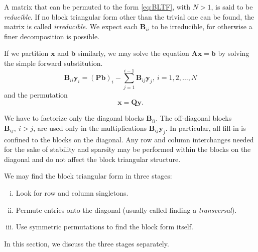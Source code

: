 \begin{defn}
  A matrix that can be permuted to the form \eqref{eq:BLTF}, with
  $N>1$, is said to be \emph{reducible}. If no block triangular form
  other than the trivial one can be found, the matrix is called
  \emph{irreducible}. We expect each $\mathbf{B}_{ii}$ to be irreducible, for
  otherwise a finer decomposition is possible.
\end{defn}

\begin{alg}
  If we partition $\mathbf{x}$ and $\mathbf{b}$ similarly, we may solve the equation
  $\mathbf{Ax=b}$ by solving the simple forward substitution.
  \begin{equation}
    \label{eq:BLTFSolving}
    \mathbf{B}_{ii}\mathbf{y}_i=(\mathbf{Pb})_i-\sum\limits_{j=1}^{i-1}\mathbf{B}_{ij}\mathbf{y}_j,\
    i=1,2,\ldots,N 
  \end{equation}
  and the permutation
  \begin{equation}
    \label{eq:PermutationYtoX}
    \mathbf{x=Qy}.
  \end{equation}
\end{alg}

\begin{rmk}
  We have to factorize only the
  diagonal blocks $\mathbf{B}_{ii}$. The off-diagonal blocks $\mathbf{B}_{ij},\ i>j$,
  are used only in the multiplications $\mathbf{B}_{ij}\mathbf{y}_j$. In particular, all
  fill-in is confined to the blocks on the diagonal. Any row and
  column interchanges needed for the sake of stability and sparsity
  may be performed within the blocks on the diagonal and do not affect
  the block triangular structure.
\end{rmk}

\begin{alg}
  We may find the block triangular form in three stages:
  \begin{enumerate}[(i)]
  \item Look for row and column singletons.
  \item Permute entries onto the diagonal (usually called finding a
    \emph{transversal}).
  \item Use symmetric permutations to find the block form itself.
  \end{enumerate}
  In this section, we discuss the three stages separately.
\end{alg}

